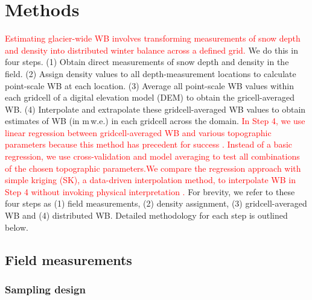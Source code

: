 \documentclass[twocolumn, letterpaper]{igs}
\begin{document}
\section{Methods}

\textcolor{red}{Estimating glacier-wide WB involves transforming measurements of snow depth and density into distributed winter balance across a defined grid.} We do this in four steps. (1) Obtain direct measurements of snow depth and density in the field. (2) Assign density values to all depth-measurement locations to calculate point-scale WB at each location. (3) Average all point-scale WB values within each gridcell of a digital elevation model (DEM) to obtain the gricell-averaged WB. (4) Interpolate and extrapolate these gridcell-averaged WB values to obtain estimates of WB (in m\,w.e.) in each gridcell across the domain. \textcolor{red}{In Step 4, we use linear regression between gridcell-averaged WB and various topographic parameters because this method has precedent for success \citep[e.g.][]{McGrath2015}. Instead of a basic regression, we use cross-validation and model averaging to test all combinations of the chosen topographic parameters.We compare the regression approach with simple kriging (SK), a data-driven interpolation method, to interpolate WB in Step 4 without invoking physical interpretation \citep[e.g.][]{Hock1999}.} For brevity, we refer to these four steps as (1) field measurements, (2) density assignment, (3) gridcell-averaged WB and (4) distributed WB. Detailed methodology for each step is outlined below.

\subsection{Field measurements}

\subsubsection{Sampling design}
\end{document}
